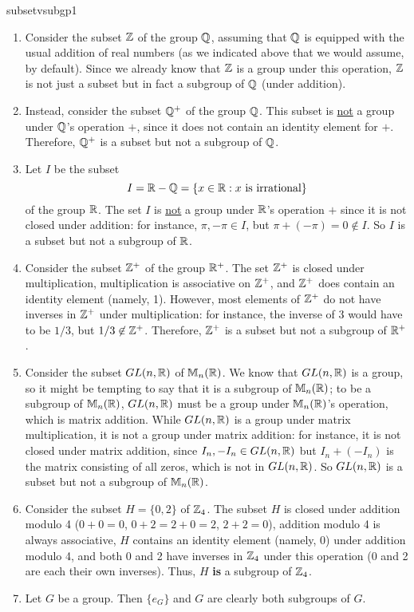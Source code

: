 \begin{example}{subsetvsubgp1}\

\begin{enumerate}
\item
Consider the subset $\mathbb{Z}$ of the group $\mathbb{Q}$, assuming that $\mathbb{Q}$ is equipped with the usual addition of real numbers (as we indicated above that we would assume, by default).  Since we already know that $\mathbb{Z}$ is a group under this operation, $\mathbb{Z}$ is not just a subset but in fact a subgroup of $\mathbb{Q}$ (under addition).

\item
Instead, consider the subset $\mathbb{Q}^+$ of the group $\mathbb{Q}$.  This
subset is \underline{not} a group under $\mathbb{Q}$'s operation $+$,
since it does not contain an identity element for $+$.  Therefore,
$\mathbb{Q}^+$ is a subset but not a subgroup of $\mathbb{Q}$.

\item Let $I$ be the subset $$I=\mathbb{R}-\mathbb{Q}=\{x\in \mathbb{R}: x
    \mbox{ is irrational}\}$$ of the group $\mathbb{R}$. The set
    $I$ is \underline{not} a group under $\mathbb{R}$'s
    operation $+$ since it is not closed under addition:
    for instance, $\pi, -\pi \in I$, but
    $\pi+(-\pi)=0\not\in I$.  So $I$ is a subset but not a
    subgroup of $\mathbb{R}$.

\item Consider the subset $\mathbb{Z}^+$ of the group $\mathbb{R}^+$.
The set $\mathbb{Z}^+$ is closed under multiplication, multiplication is
associative on $\mathbb{Z}^+$, and $\mathbb{Z}^+$ does contain an identity element
(namely, 1).  However, most elements of $\mathbb{Z}^+$ do not have inverses
in $\mathbb{Z}^+$ under multiplication: for instance, the inverse of $3$
would have to be $1/3$, but $1/3\not\in \mathbb{Z}^+$.  Therefore, $\mathbb{Z}^+$ is
a subset but not a subgroup of $\mathbb{R}^+$.

\item Consider the subset $GL(n,\mathbb{R})$ of $\mathbb{M}_n(\mathbb{R})$.  We know that $GL(n,\mathbb{R})$ is a group, so it might be tempting to say that it is a subgroup of $\mathbb{M}_n(\mathbb{R})$; to be a subgroup of $\mathbb{M}_n(\mathbb{R})$, $GL(n,\mathbb{R})$ must be a group under $\mathbb{M}_n(\mathbb{R})$'s operation, which is matrix addition.  While $GL(n,\mathbb{R})$ is a group under matrix multiplication, it is not a group under matrix addition: for instance, it is not closed under matrix addition, since $I_n, -I_n\in GL(n,\mathbb{R})$ but $I_n+(-I_n)$ is the matrix consisting of all zeros, which is not in $GL(n,\mathbb{R})$. So $GL(n,\mathbb{R})$ is a subset but not a subgroup of $\mathbb{M}_n(\mathbb{R})$.

\item Consider the subset $H=\{0,2\}$ of $\mathbb{Z}_4$.  The subset $H$ is closed under addition modulo 4 ($0+0=0$, $0+2=2+0=2$, $2+2=0$), addition modulo 4 is always associative, $H$ contains an identity element (namely, 0) under addition modulo 4, and both 0 and 2 have inverses in $\mathbb{Z}_4$ under this operation (0 and 2 are each their own inverses).  Thus, $H$ \textbf{is} a subgroup of $\mathbb{Z}_4$.
\item Let $G$ be a group.  Then $\{e_G\}$ and $G$ are clearly both subgroups of $G$.\end{enumerate}
\end{example}

